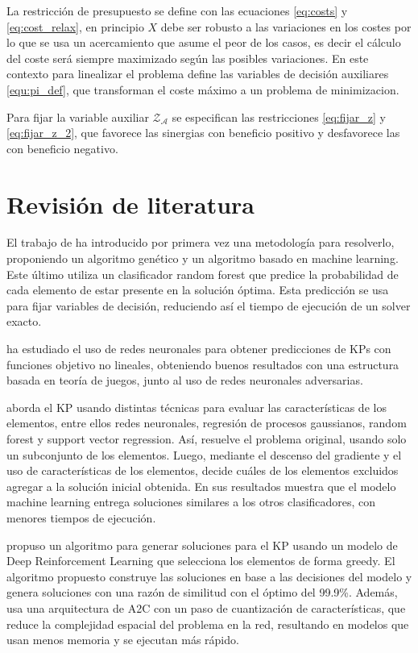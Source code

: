\documentclass[spanish, a4paper, 12pt, openany,final]{book}
\begin{document}
    La restricción de presupuesto se define con las ecuaciones \ref{eq:costs} y \ref{eq:cost_relax}, en principio $X$ debe ser robusto a las variaciones en los costes por lo que se usa un acercamiento que asume el peor de los casos, es decir el cálculo del coste será siempre maximizado según las posibles variaciones. En este contexto para linealizar el problema \cite{baldo_polynomial_2023} define las variables de decisión auxiliares \ref{equ:pi_def}, que transforman el coste máximo a un problema de minimizacion.
    
    Para fijar la variable auxiliar $\mathcal{Z_A}$ se especifican las restricciones \ref{eq:fijar_z} y \ref{eq:fijar_z_2}, que favorece las sinergias con beneficio positivo y desfavorece las con beneficio negativo.
  
\section{Revisión de literatura}


El trabajo de \cite{baldo_polynomial_2023} ha introducido por primera vez una metodología para resolverlo, proponiendo un algoritmo genético y un algoritmo basado en machine learning. Este último utiliza un clasificador random forest que predice la probabilidad de cada elemento de estar presente en la solución óptima. Esta predicción se usa para fijar variables de decisión, reduciendo así el tiempo de ejecución de un solver exacto.

\cite{li_novel_2021} ha estudiado el uso de redes neuronales para obtener predicciones de KPs con funciones objetivo no lineales, obteniendo buenos resultados con una estructura basada en teoría de juegos, junto al uso de redes neuronales adversarias.

\cite{rezoug_application_2022} aborda el KP usando distintas técnicas para evaluar las características de los elementos, entre ellos redes neuronales, regresión de procesos gaussianos, random forest y support vector regression. Así, resuelve el problema original, usando solo un subconjunto de los elementos. Luego, mediante el descenso del gradiente y el uso de características de los elementos, decide cuáles de los elementos excluidos agregar a la solución inicial obtenida. En sus resultados muestra que el modelo machine learning entrega soluciones similares a los otros clasificadores, con menores tiempos de ejecución.

\cite{afshar_state_2020} propuso un algoritmo para generar soluciones para el KP usando un modelo de Deep Reinforcement Learning que selecciona los elementos de forma greedy. El algoritmo propuesto construye las soluciones en base a las decisiones del modelo y genera soluciones con una razón de similitud con el óptimo del 99.9\%. Además, usa una arquitectura de A2C con un paso de cuantización de características, que reduce la complejidad espacial del problema en la red, resultando en modelos que usan menos memoria y se ejecutan más rápido.
\end{document}
